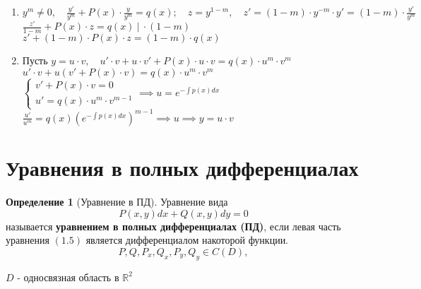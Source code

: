 \documentclass{report}
\theoremstyle{definition}
\newtheorem{definition}{Определение}[section]
\begin{document}
\begin{enumerate}
    \item $y^m \ne 0, \quad \frac{y'}{y^m} + P(x) \cdot \frac{y}{y^m} = q(x); \quad z = y^{1-m}, \quad z' = (1-m)\cdot y^{-m}\cdot y' = (1-m)\cdot \frac{y'}{y^m}$ \\

          $\frac{z'}{1-m} + P(x) \cdot z = q(x) \ \big| \ \cdot (1-m)$ \\

          $z' + (1-m) \cdot P(x) \cdot z = (1-m)\cdot q(x)$

    \item Пусть $y = u\cdot v, \quad u' \cdot v + u \cdot v' + P(x) \cdot u \cdot v = q(x) \cdot u^m \cdot v^m$ \\

          $u' \cdot v  + u(v' + P(x) \cdot v) = q(x) \cdot u^m\cdot v^m$ \\

          $\left\{\begin{array}{l}
                  v' + P(x) \cdot v = 0 \\
                  u' = q(x) \cdot u^m \cdot v^{m-1}
              \end{array}\right. \implies u = e^{-\int p(x)dx}$ \\

          $\frac{u'}{u^m} = q(x)(e^{-\int p(x)dx})^{m-1} \implies u \implies y = u \cdot v$
\end{enumerate}

\section{Уравнения в полных дифференциалах}

\begin{definition}[Уравнение в ПД]
    Уравнение вида
    \begin{equation}
        P(x,y)dx + Q(x,y)dy = 0
    \end{equation}
    называется \textbf{уравнением в полных дифференциалах (ПД)}, если левая часть уравнения $(1.5)$ является дифференциалом накоторой функции.
    \begin{equation}
        P,Q,P_x,Q_x,P_y,Q_y \in C(D),
    \end{equation}
    \begin{center}
        $D$ - односвязная область в $\mathbb{R}^2$
    \end{center}
\end{definition}
\end{document}
